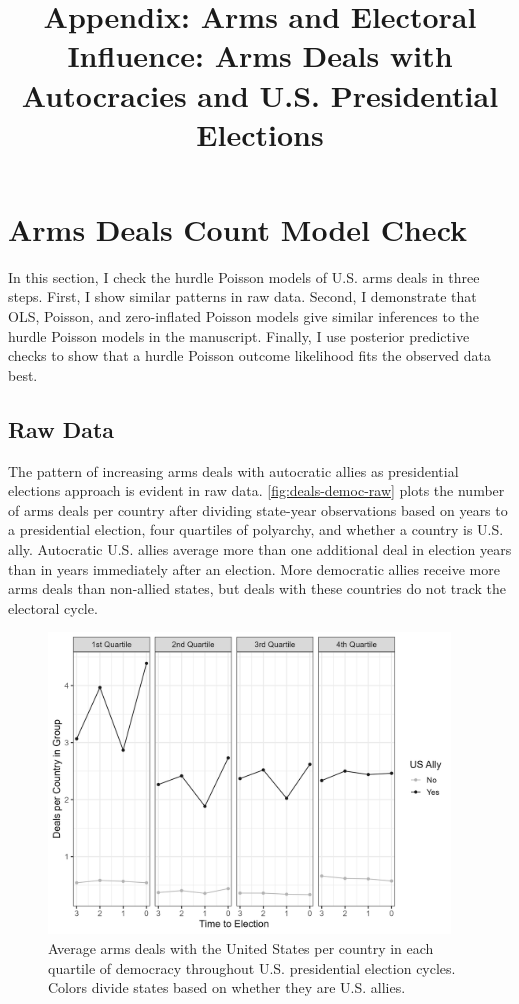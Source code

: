 \documentclass[12pt]{article}
\title{\textbf{Appendix: Arms and Electoral Influence: Arms Deals with Autocracies and U.S. Presidential Elections}}
\date{}
\begin{document}
\maketitle 

\singlespace 

\tableofcontents

\bigskip





\section{Arms Deals Count Model Check}

In this section, I check the hurdle Poisson models of U.S. arms deals in three steps. 
First, I show similar patterns in raw data. 
Second, I demonstrate that OLS, Poisson, and zero-inflated Poisson models give similar inferences to the hurdle Poisson models in the manuscript. 
Finally, I use posterior predictive checks to show that a hurdle Poisson outcome likelihood fits the observed data best. 


\subsection{Raw Data}

The pattern of increasing arms deals with autocratic allies as presidential elections approach is evident in raw data.
\autoref{fig:deals-democ-raw} plots the number of arms deals per country after dividing state-year observations based on years to a presidential election, four quartiles of polyarchy, and whether a country is U.S. ally.
Autocratic U.S. allies average more than one additional deal in election years than in years immediately after an election. 
More democratic allies receive more arms deals than non-allied states, but deals with these countries do not track the electoral cycle. 


\begin{figure}[htpb]
	\centering
		\includegraphics[width=0.95\textwidth]{deals-democ-raw.png}
	\caption{Average arms deals with the United States per country in each quartile of democracy throughout U.S. presidential election cycles. Colors divide states based on whether they are U.S. allies.}
	\label{fig:deals-democ-raw}
\end{figure}
\end{document}

